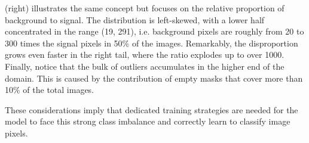  (right) illustrates the same concept but focuses on the relative proportion of background to signal. 
The distribution is left-skewed, with a lower half concentrated in the range (19, 291), i.e. background pixels are roughly from 20 to 300 times the signal pixels in 50\% of the images.
Remarkably, the disproportion grows even faster in the right tail, where the ratio explodes up to over 1000. 
Finally, notice that the bulk of outliers accumulates in the higher end of the domain. 
This is caused by the contribution of empty masks that cover more than 10\% of the total images.

These considerations imply that dedicated training strategies are needed for the model to face this strong class imbalance and correctly learn to classify image pixels.

